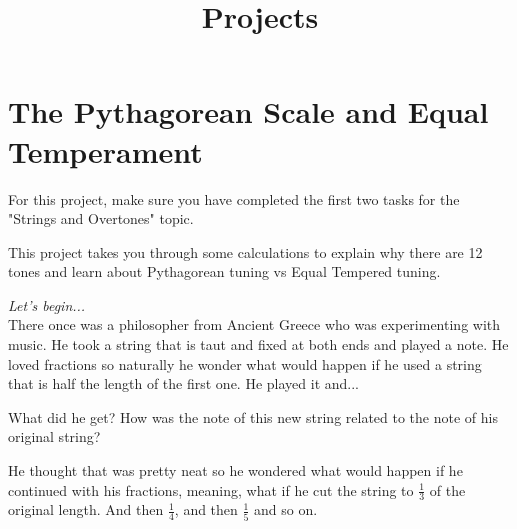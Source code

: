 \documentclass[12pt,noauthor,nooutcomes,hints,instructornotes]{ximera}%
\author{}
\title{Projects}
\begin{document}
\section{The Pythagorean Scale and Equal Temperament}

For this project, make sure you have completed the first two tasks for the "Strings and Overtones" topic.

This project takes you through some calculations to explain why there are 12 tones and learn about Pythagorean tuning vs Equal Tempered tuning.


\textit{Let's begin...}\\
There once was a philosopher from Ancient Greece who was experimenting with music. He took a string that is taut and fixed at both ends and played a note. He loved fractions so naturally he wonder what would happen if he used a string that is half the length of the first one. He played it and...

\begin{question}
 What did he get?  How was the note of this new string related to the note of his original string?
 \end{question}

He thought that was pretty neat so he wondered what would happen if he continued with his fractions, meaning, what if he cut the string to $\frac{1}{3}$ of the original length. And then $\frac{1}{4}$, and then $\frac{1}{5}$ and so on.
\end{document}
